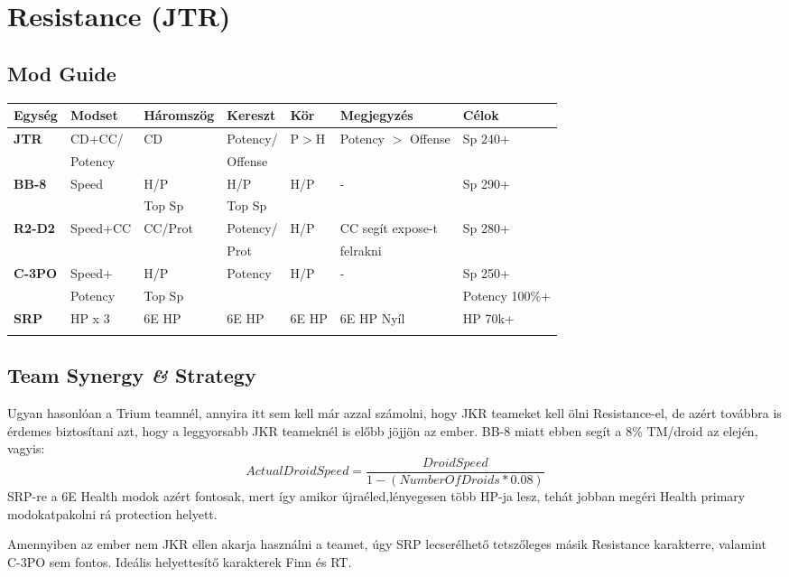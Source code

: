 \documentclass[11pt]{report}
\begin{document}
\chapter{Resistance (JTR)}
\section{Mod Guide}
\begin{center}
    \begin{tabular}{|l | l | l | l | l | l | l |}
        \hline
        Egység & Modset & Háromszög & Kereszt & Kör & Megjegyzés & Célok\\ \hline
        \textbf{JTR} & CD+CC/ & CD & Potency/ & P$>$H & Potency $>$ Offense & Sp 240+\\
        & Potency &  & Offense &  &  & \\ \hline
        \textbf{BB-8} & Speed & H/P & H/P & H/P & - & Sp 290+\\
        &  & Top Sp & Top Sp &  &  & \\ \hline
        \textbf{R2-D2} & Speed+CC & CC/Prot & Potency/ & H/P & CC segít expose-t & Sp 280+\\
        &  &  & Prot &  & felrakni & \\ \hline
        \textbf{C-3PO} & Speed+ & H/P & Potency & H/P & - & Sp 250+\\
        & Potency & Top Sp &  &  &  & Potency 100\%+\\ \hline
        \textbf{SRP} & HP x 3 & 6E HP & 6E HP & 6E HP & 6E HP Nyíl & HP 70k+\\
        &  &  &  &  &  & \\ \hline   
    \end{tabular}
\end{center}
\section{Team Synergy \textit{\&} Strategy}
Ugyan hasonlóan a Trium teamnél, annyira itt sem kell már azzal számolni, hogy JKR teameket kell ölni Resistance-el, de azért továbbra is érdemes biztosítani azt, hogy a leggyorsabb JKR teameknél is előbb jöjjön az ember. BB-8 miatt ebben segít a 8\% TM/droid az elején, vagyis:
\begin{equation}
    ActualDroidSpeed = \frac{DroidSpeed}{1-(NumberOfDroids*0.08)}        
\end{equation}
SRP-re a 6E Health modok azért fontosak, mert így amikor újraéled,lényegesen több HP-ja lesz, tehát jobban megéri Health primary modokatpakolni rá protection helyett.\par
Amennyiben az ember nem JKR ellen akarja használni a teamet, úgy SRP lecserélhető tetszőleges másik Resistance karakterre, valamint C-3PO sem fontos. Ideális helyettesítő karakterek Finn és RT.
\end{document}
